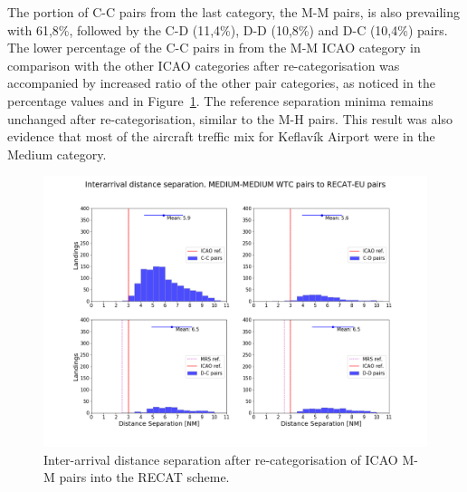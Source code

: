 The portion of C-C pairs from the last category, the M-M pairs, is also prevailing with 61,8\%, followed by the C-D (11,4\%), D-D (10,8\%) and D-C (10,4\%) pairs. The lower percentage of the C-C pairs in from the M-M ICAO category in comparison with the other ICAO categories after re-categorisation was accompanied by increased ratio of the other pair categories, as noticed in the percentage values and in Figure~\ref{fig:MM_to_RECAT_pairs_dist_separ}. The reference separation minima remains unchanged after re-categorisation, similar to the M-H pairs. This result was also evidence that most of the aircraft treffic mix for Keflavík Airport were in the Medium category.
\begin{figure}[h]
    \centering
    \includegraphics[width=1.0\textwidth]{graphics/fig_MM_to_RECAT_pairs_dist_separ.png}
    \caption[Inter-arrival distance separation of ICAO M-M pairs into the RECAT scheme]{Inter-arrival distance separation after re-categorisation of ICAO M-M pairs into the RECAT scheme.}
    \label{fig:MM_to_RECAT_pairs_dist_separ}
\end{figure}

